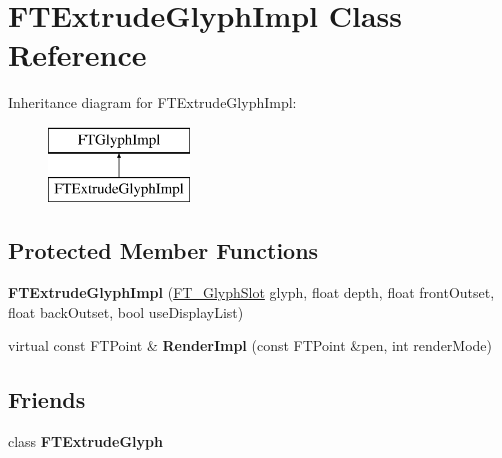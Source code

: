 \hypertarget{class_f_t_extrude_glyph_impl}{}\section{F\+T\+Extrude\+Glyph\+Impl Class Reference}
\label{class_f_t_extrude_glyph_impl}
Inheritance diagram for F\+T\+Extrude\+Glyph\+Impl\+:\begin{figure}[H]
\begin{center}
\leavevmode
\includegraphics[height=2.000000cm]{class_f_t_extrude_glyph_impl}
\end{center}
\end{figure}
\subsection*{Protected Member Functions}
\begin{DoxyCompactItemize}
\item 
{\bfseries F\+T\+Extrude\+Glyph\+Impl} (\hyperlink{struct_f_t___glyph_slot_rec__}{F\+T\+\_\+\+Glyph\+Slot} glyph, float depth, float front\+Outset, float back\+Outset, bool use\+Display\+List)\hypertarget{class_f_t_extrude_glyph_impl_adbfa8d05122539318f6caa8b77a5c291}{}\label{class_f_t_extrude_glyph_impl_adbfa8d05122539318f6caa8b77a5c291}

\item 
virtual const F\+T\+Point \& {\bfseries Render\+Impl} (const F\+T\+Point \&pen, int render\+Mode)\hypertarget{class_f_t_extrude_glyph_impl_a7ba3363d6764a14a6954f068f626029b}{}\label{class_f_t_extrude_glyph_impl_a7ba3363d6764a14a6954f068f626029b}

\end{DoxyCompactItemize}
\subsection*{Friends}
\begin{DoxyCompactItemize}
\item 
class {\bfseries F\+T\+Extrude\+Glyph}\hypertarget{class_f_t_extrude_glyph_impl_a43bdcab05c1db93d9474fee8176c1fb0}{}\label{class_f_t_extrude_glyph_impl_a43bdcab05c1db93d9474fee8176c1fb0}

\end{DoxyCompactItemize}
